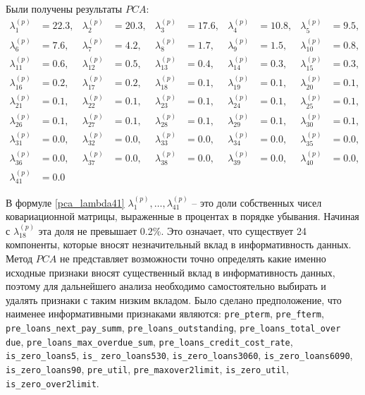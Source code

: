 Были получены результаты $PCA$:
\begin{equation}
\label{pca_lambda41}
\begin{alignedat}{5} %
\lambda_{1}^{(p)}  &= 22.3, & \lambda_{2}^{(p)}  &= 20.3, & \lambda_{3}^{(p)}  &= 17.6, & \lambda_{4}^{(p)}  &= 10.8, & \lambda_{5}^{(p)}  &=  9.5,\\
\lambda_{6}^{(p)}  &=  7.6, & \lambda_{7}^{(p)}  &=  4.2, & \lambda_{8}^{(p)}  &=  1.7, & \lambda_{9}^{(p)}  &=  1.5, & \lambda_{10}^{(p)} &=  0.8,\\
\lambda_{11}^{(p)} &= 0.6, & \lambda_{12}^{(p)} &= 0.5, & \lambda_{13}^{(p)} &= 0.4, & \lambda_{14}^{(p)} &= 0.3, & \lambda_{15}^{(p)} &= 0.3,\\
\lambda_{16}^{(p)} &= 0.2, & \lambda_{17}^{(p)} &= 0.2, & \lambda_{18}^{(p)} &= 0.1, & \lambda_{19}^{(p)} &= 0.1, & \lambda_{20}^{(p)} &= 0.1,\\
\lambda_{21}^{(p)} &= 0.1, & \lambda_{22}^{(p)} &= 0.1, & \lambda_{23}^{(p)} &= 0.1, & \lambda_{24}^{(p)} &= 0.1, & \lambda_{25}^{(p)} &= 0.1,\\
\lambda_{26}^{(p)} &= 0.1, & \lambda_{27}^{(p)} &= 0.1, & \lambda_{28}^{(p)} &= 0.1, & \lambda_{29}^{(p)} &= 0.1, & \lambda_{30}^{(p)} &= 0.1,\\
\lambda_{31}^{(p)} &= 0.0, & \lambda_{32}^{(p)} &= 0.0, & \lambda_{33}^{(p)} &= 0.0, & \lambda_{34}^{(p)} &= 0.0, & \lambda_{35}^{(p)} &= 0.0,\\
\lambda_{36}^{(p)} &= 0.0, & \lambda_{37}^{(p)} &= 0.0, & \lambda_{38}^{(p)} &= 0.0, & \lambda_{39}^{(p)} &= 0.0, & \lambda_{40}^{(p)} &= 0.0,\\
\lambda_{41}^{(p)} &= 0.0
\end{alignedat}
\end{equation}

В формуле \eqref{pca_lambda41} $\lambda_{1}^{(p)},\dots, \lambda_{41}^{(p)}$ -- это доли собственных чисел ковариационной матрицы, выраженные в процентах в порядке убывания. Начиная с  $\lambda_{18}^{(p)}$ эта доля не превышает 0.2\%. Это означает, что существует 24 компоненты, которые вносят незначительный вклад в информативность данных. Метод $PCA$ не представляет возможности точно определять какие именно исходные признаки вносят существенный вклад в информативность данных, поэтому для дальнейшего анализа необходимо самостоятельно выбирать и удалять признаки с таким низким вкладом. Было сделано предположение, что наименее информативными признаками являются: \texttt{pre\_pterm}, \texttt{pre\_fterm}, \texttt{pre\_loans\_next\_pay\_summ}, \texttt{pre\_loans\_outstanding}, \texttt{pre\_loans\_total\_over} \\ \texttt{due}, \texttt{pre\_loans\_max\_overdue\_sum}, \texttt{pre\_loans\_credit\_cost\_rate}, \texttt{is\_zero\_loans5}, 
\texttt{is\_} \texttt{zero\_loans530}, \texttt{is\_zero\_loans3060}, \texttt{is\_zero\_loans6090}, \texttt{is\_zero\_loans90}, \texttt{pre\_util}, \texttt{pre\_maxover2limit}, \texttt{is\_zero\_util},  \texttt{is\_zero\_over2limit}. 
 
